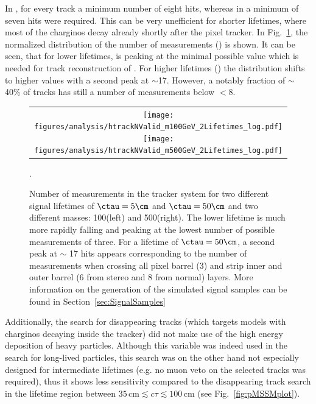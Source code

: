 In \cite{bib:CMS:HSCP_8TeV}, for every track a minimum number of eight hits, whereas in \cite{bib:CMS:DT_8TeV} a minimum of seven hits were required. 
This can be very unefficient for shorter lifetimes, where most of the charginos decay already shortly after the pixel tracker.
In Fig.~\ref{fig:NHits_2Signal_noSelection_normalized}, the normalized distribution of the number of measurements (\nhits) is shown. 
It can be seen, that for lower lifetimes, \nhits is peaking at the minimal possible value which is needed for track reconstruction of .
For higher lifetimes (\cm) the distribution shifts to higher values with a second peak at \nhits$\sim$17.
However, a notably fraction of $\sim$ 40\% of tracks has still a number of measurements below \nhits$<$8. 
\begin{figure}[!bt]
  \centering 
  \begin{tabular}{c}
  \texttt{[image: figures/analysis/htrackNValid\_m100GeV\_2Lifetimes\_log.pdf]}
  \texttt{[image: figures/analysis/htrackNValid\_m500GeV\_2Lifetimes\_log.pdf]}
  \end{tabular}
  \caption{Number of measurements in the tracker system \nhits for two different signal lifetimes of $\ctau=5\cm$ and $\ctau=50\cm$ and two different masses: 100\gev (left) and 500\gev (right). 
           The lower lifetime is much more rapidly falling and peaking at the lowest number of possible measurements of three. 
           For a lifetime of $\ctau=50\cm$, a second peak at $\sim$ 17 hits appears corresponding to the number of measurements when crossing all pixel barrel (3) and strip inner and outer barrel (6 from stereo and 8 from normal) layers.
           More information on the generation of the simulated signal samples can be found in Section~\ref{sec:SignalSamples}}. 
  \label{fig:NHits_2Signal_noSelection_normalized}
\end{figure}

Additionally, the search for disappearing tracks (which targets models with charginos decaying inside the tracker) did not make use of the high energy deposition of heavy particles. 
Although this variable was indeed used in the search for long-lived particles, this search was on the other hand not especially designed for intermediate lifetimes (e.g. no muon veto on the selected tracks was required), 
thus it shows less sensitivity compared to the disappearing track search in the lifetime region between $35\,\text{cm} \lesssim c\tau \lesssim 100\,\text{cm}$ (see Fig.~\ref{fig:pMSSMplot}).

